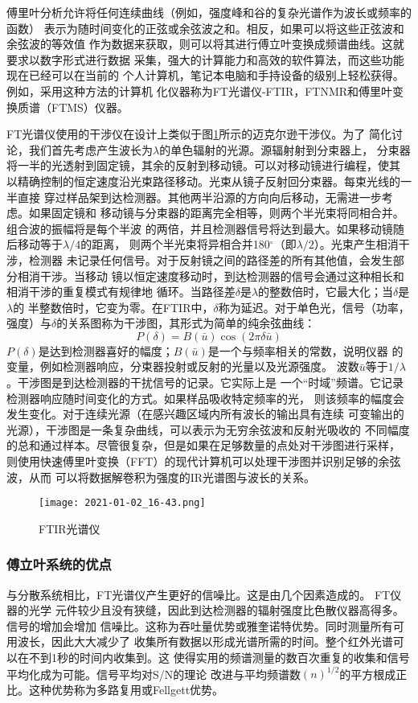 傅里叶分析允许将任何连续曲线（例如，强度峰和谷的复杂光谱作为波长或频率的函数）
表示为随时间变化的正弦或余弦波之和。相反，如果可以将这些正弦波和余弦波的等效值
作为数据来获取，则可以将其进行傅立叶变换成频谱曲线。这就要求以数字形式进行数据
采集，强大的计算能力和高效的软件算法，而这些功能现在已经可以在当前的
个人计算机，笔记本电脑和手持设备的级别上轻松获得。例如，采用这种方法的计算机
化仪器称为FT光谱仪-FTIR，FTNMR和傅里叶变换质谱（FTMS）仪器。

FT光谱仪使用的干涉仪在设计上类似于图\ref{fig:2.34}所示的迈克尔逊干涉仪。为了
简化讨论，我们首先考虑产生波长为$\lambda$的单色辐射的光源。源辐射射到分束器上，
分束器将一半的光透射到固定镜，其余的反射到移动镜。可以对移动镜进行编程，使其
以精确控制的恒定速度沿光束路径移动。光束从镜子反射回分束器。每束光线的一半直接
穿过样品架到达检测器。其他两半沿源的方向向后移动，无需进一步考虑。如果固定镜和
移动镜与分束器的距离完全相等，则两个半光束将同相合并。组合波的振幅将是每个半波
的两倍，并且检测器信号将达到最大。如果移动镜随后移动等于$\lambda / 4$的距离，
则两个半光束将异相合并180$^\circ$（即$\lambda/ 2$）。光束产生相消干涉，检测器
未记录任何信号。对于反射镜之间的路径差的所有其他值，会发生部分相消干涉。当移动
镜以恒定速度移动时，到达检测器的信号会通过这种相长和相消干涉的重复模式有规律地
循环。当路径差$\delta$是$\lambda$的整数倍时，它最大化；当$\delta$是$\lambda$的
半整数倍时，它变为零。在FTIR中，$\delta$称为延迟。对于单色光，信号（功率，
强度）与$\delta$的关系图称为干涉图，其形式为简单的纯余弦曲线：
\begin{equation}
    P(\delta)=B(\bar{u})\cos(2\pi\delta\bar{u})
    \label{2.24}
\end{equation}
$P(\delta)$是达到检测器喜好的幅度；$B(\bar{u})$是一个与频率相关的常数，说明仪器
的变量，例如检测器响应，分束器投射或反射的光量以及光源强度。
波数$\bar{u}$等于$1/\lambda$。干涉图是到达检测器的干扰信号的记录。它实际上是
一个“时域”频谱。它记录检测器响应随时间变化的方式。如果样品吸收特定频率的光，
则该频率的幅度会发生变化。对于连续光源（在感兴趣区域内所有波长的输出具有连续
可变输出的光源），干涉图是一条复杂曲线，可以表示为无穷余弦波和反射光吸收的
不同幅度的总和通过样本。尽管很复杂，但是如果在足够数量的点处对干涉图进行采样，
则使用快速傅里叶变换（FFT）的现代计算机可以处理干涉图并识别足够的余弦波，从而
可以将数据解卷积为强度的IR光谱图与波长的关系。
\begin{figure}[htpb]
    \centering
    \texttt{[image: 2021-01-02\_16-43.png]}
    \caption{FTIR光谱仪}
    \label{fig:2.34}
\end{figure}
\subsubsection{傅立叶系统的优点}
与分散系统相比，FT光谱仪产生更好的信噪比。这是由几个因素造成的。 FT仪器的光学
元件较少且没有狭缝，因此到达检测器的辐射强度比色散仪器高得多。信号的增加会增加
信噪比。这称为吞吐量优势或雅奎诺特优势。同时测量所有可用波长，因此大大减少了
收集所有数据以形成光谱所需的时间。整个红外光谱可以在不到1秒的时间内收集到。这
使得实用的频谱测量的数百次重复的收集和信号平均化成为可能。信号平均对S/N的理论
改进与平均频谱数$(n)^{1/2}$的平方根成正比。这种优势称为多路复用或Fellgett优势。

